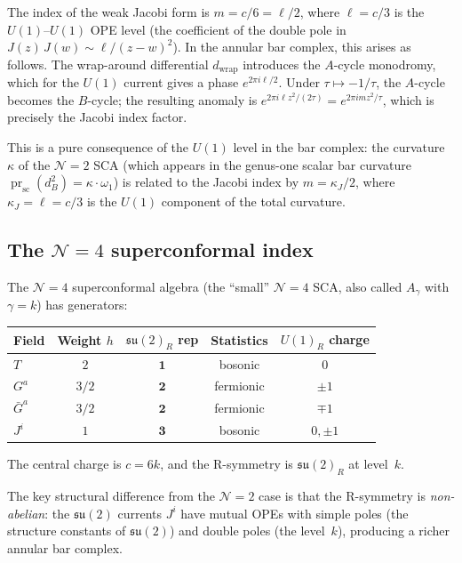 \begin{remark}[The index $m = c/6$ from the $U(1)$
anomaly]%
\label{rem:jacobi-index-u1-anomaly}%
%
The index of the weak Jacobi form is
$m = c/6 = \ell/2$, where $\ell = c/3$ is the
$U(1)$--$U(1)$ OPE level (the coefficient of the
double pole in $J(z)\,J(w)\sim\ell/(z{-}w)^2$).
In the annular bar complex, this arises as follows.
The wrap-around differential $d_{\mathrm{wrap}}$
introduces the $A$-cycle monodromy, which for the
$U(1)$ current gives a phase $e^{2\pi i\ell/2}$.
Under $\tau\mapsto -1/\tau$, the $A$-cycle becomes the
$B$-cycle; the resulting anomaly is
$e^{2\pi i\ell z^2/(2\tau)} = e^{2\pi i m z^2/\tau}$,
which is precisely the Jacobi index factor.

This is a pure consequence of the $U(1)$
level in the bar complex: the curvature $\kappa$
of the $\mathcal N=2$ SCA (which appears in the
genus-one scalar bar curvature
$\operatorname{pr}_{\mathrm{sc}}(d_B^2) = \kappa\cdot\omega_1$)
is related to the Jacobi index by
$m = \kappa_J/2$, where $\kappa_J = \ell = c/3$ is the
$U(1)$ component of the total curvature.
\end{remark}

\subsection{The $\mathcal{N}=4$ superconformal index}
\label{subsec:n4-superconformal-index}

The $\mathcal{N}=4$ superconformal algebra (the ``small''
$\mathcal{N}=4$ SCA, also called $A_\gamma$ with
$\gamma = k$) has generators:
\begin{center}
\renewcommand{\arraystretch}{1.15}
\begin{tabular}{lcccc}
\textbf{Field} & \textbf{Weight $h$}
& \textbf{$\mathfrak{su}(2)_R$ rep}
& \textbf{Statistics} & \textbf{$U(1)_R$ charge} \\
\hline
$T$ & $2$ & $\mathbf{1}$ & bosonic & $0$ \\
$G^a$ & $3/2$ & $\mathbf{2}$ & fermionic & $\pm 1$ \\
$\bar G^a$ & $3/2$ & $\mathbf{2}$ & fermionic & $\mp 1$ \\
$J^i$ & $1$ & $\mathbf{3}$ & bosonic & $0,\pm 1$
\end{tabular}
\end{center}
The central charge is $c = 6k$, and the R-symmetry is
$\mathfrak{su}(2)_R$ at level~$k$.

The key structural difference from the $\mathcal N=2$
case is that the R-symmetry is \emph{non-abelian}: the
$\mathfrak{su}(2)$ currents $J^i$ have mutual OPEs
with simple poles (the structure constants of
$\mathfrak{su}(2)$) and double poles (the level~$k$),
producing a richer annular bar complex.


